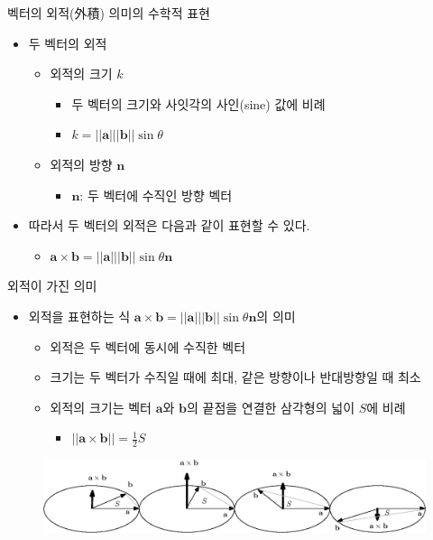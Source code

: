 \begin{frame}{벡터의 외적(外積) 의미의 수학적 표현}

\begin{itemize}
\item 두 벡터의 외적
	\begin{itemize}
	\item 외적의 크기 $k$
		\begin{itemize}
		\item 두 벡터의 크기와 사잇각의 사인(sine) 값에 비례
		\item $k = ||\mathbf a|| |\mathbf b|| \sin \theta$
		\end{itemize}
	\item 외적의 방향 $\mathbf n$
		\begin{itemize}
		\item $\mathbf n$: 두 벡터에 수직인 방향 벡터
		\end{itemize}
	\end{itemize}
\item 따라서 두 벡터의 외적은 다음과 같이 표현할 수 있다.
	\begin{itemize}
	\item $\mathbf a \times \mathbf b = ||\mathbf a|| |\mathbf b|| \sin \theta \mathbf n$
	\end{itemize}
\end{itemize}


\end{frame}

\begin{frame}{외적이 가진 의미}

\begin{itemize}
\item 외적을 표현하는 식 $\mathbf a \times \mathbf b = ||\mathbf a|| |\mathbf b|| \sin \theta \mathbf n$의 의미
	\begin{itemize}
	\item 외적은 두 벡터에 동시에 수직한 벡터
	\item 크기는 두 벡터가 수직일 때에 최대, 같은 방향이나 반대방향일 때 최소
	\item 외적의 크기는 벡터 $\mathbf a$와 $\mathbf b$의 끝점을 연결한 삼각형의 넓이 $S$에 비례
		\begin{itemize}
		\item $|| \mathbf a \times \mathbf b || = \frac{1}{2} S $
		\end{itemize}
		\end{itemize}
\end{itemize}


\begin{figure}
\includegraphics[width=12cm]{Math_vector/crossProductDirSize.eps}
\end{figure}

\end{frame}

